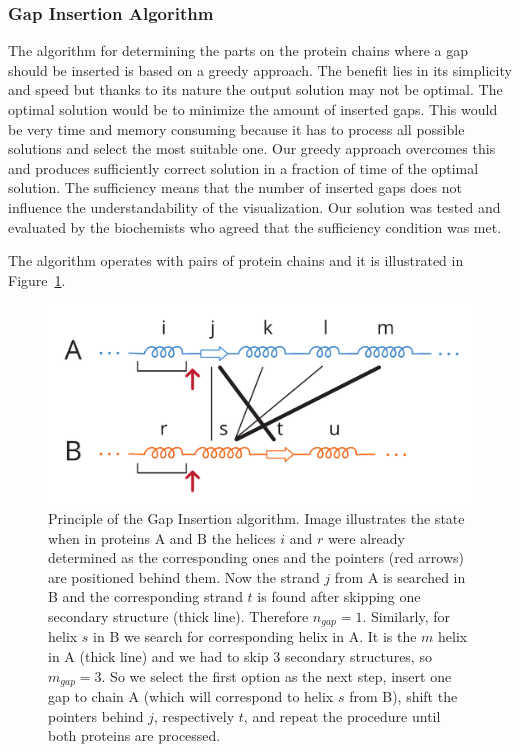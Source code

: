 \documentclass[twocolumn]{bmcart}%
\begin{document}
\subsubsection*{Gap Insertion Algorithm}
\label{sec:alg}
The algorithm for determining the parts on the protein chains where a gap should be inserted is based on a greedy approach.
The benefit lies in its simplicity and speed but thanks to its nature the output solution may not be optimal. 
The optimal solution would be to minimize the amount of inserted gaps.
This would be very time and memory consuming because it has to process all possible solutions and select the most suitable one.
Our greedy approach overcomes this and produces sufficiently correct solution in a fraction of time of the optimal solution.
The sufficiency means that the number of inserted gaps does not influence the understandability of the visualization.
Our solution was tested and evaluated by the biochemists who agreed that the sufficiency condition was met. 

The algorithm operates with pairs of protein chains and it is illustrated in Figure~\ref{fig:alg1}.

\begin{figure}[t!]
  \centering
  \includegraphics[width=0.9\linewidth]{pics/first.pdf}
  \caption{Principle of the Gap Insertion algorithm. Image illustrates the state when in proteins A and B the helices $i$ and $r$ were already determined as the corresponding ones and the pointers (red arrows) are positioned behind them. Now the strand $j$ from A is searched in B and the corresponding strand $t$ is found after skipping one secondary structure (thick line). Therefore $n_{gap} = 1$. Similarly, for helix $s$ in B we search for corresponding helix in A. It is the $m$ helix in A (thick line) and we had to skip 3 secondary structures, so  $m_{gap} = 3$. So we select the first option as the next step, insert one gap to chain A (which will correspond to helix $s$ from B), shift the pointers behind $j$, respectively $t$, and repeat the procedure until both proteins are processed.}
  \label{fig:alg1}
\end{figure}
\end{document}
